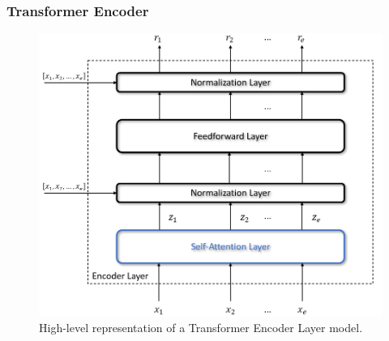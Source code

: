            \subsubsection{Transformer Encoder}
            \label{subsub:trans_encoder}
                \begin{figure}[!b]
                    \centering
                    \includegraphics[width=14cm, keepaspectratio]{images/an/transformer_encoder.png}
                    \caption{High-level representation of a Transformer Encoder Layer model.}
                    \label{fig:an_transformer_encoder}
                \end{figure}
                
